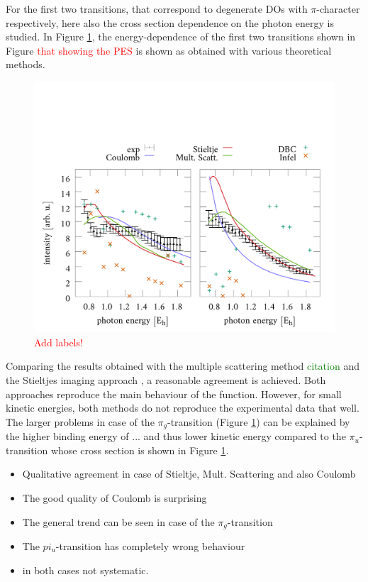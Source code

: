 For the first two transitions, that correspond to degenerate DOs with $\pi$-character respectively, here also the cross section dependence on the photon energy is studied.
In Figure \ref{fig:CO2CS}, the energy-dependence of the first two transitions shown in Figure \textcolor{red}{that showing the PES} is shown as obtained with various theoretical methods.
\begin{figure}
\includegraphics[width=\textwidth]{Figures/CO2/CrossSect}
\caption{\textcolor{red}{Add labels!}}
\label{fig:CO2CS}
\end{figure}
Comparing the results obtained with the multiple scattering method \textcolor{green}{citation} and the Stieltjes imaging approach \cite{stieltje}, a reasonable agreement is achieved.
Both approaches reproduce the main behaviour of the function.
However, for small kinetic energies, both methods do not reproduce the experimental data that well.
The larger problems in case of the $\pi_g$-transition (Figure \ref{fig:CO2CS}) can be explained by the higher binding energy of $...$ and thus lower kinetic energy compared to the $\pi_u$-transition whose cross section is shown in Figure \ref{fig:CO2CS}.
\begin{itemize}
   \item Qualitative agreement in case of Stieltje, Mult. Scattering and also Coulomb
   \item The good quality of Coulomb is surprising
   \item The general trend can be seen in case of the $\pi_g$-transition 
   \item The $pi_u$-transition has completely wrong behaviour
  \item in both cases not systematic.
\end{itemize}

